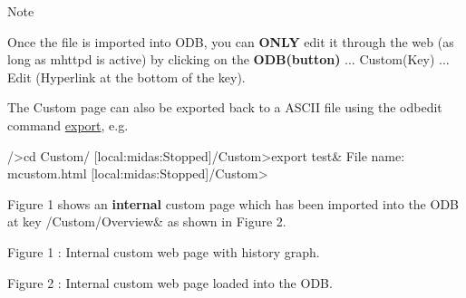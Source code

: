 \begin{DoxyNote}{Note}

\begin{DoxyItemize}
\item Once the file is imported into ODB, you can {\bfseries ONLY} edit it through the web (as long as mhttpd is active) by clicking on the {\bfseries ODB(button)} ... Custom(Key) ... Edit (Hyperlink at the bottom of the key).
\end{DoxyItemize}
\end{DoxyNote}

\begin{DoxyItemize}
\item The Custom page can also be exported back to a ASCII file using the odbedit command \hyperlink{RC_odbedit_examples_RC_odbedit_export}{export}, e.g. 
\begin{DoxyCode}
  />cd Custom/
  [local:midas:Stopped]/Custom>export test&
  File name: mcustom.html
  [local:midas:Stopped]/Custom>
\end{DoxyCode}

\end{DoxyItemize}

Figure 1 shows an {\bfseries internal} custom page which has been imported into the ODB at key /Custom/Overview\& as shown in Figure 2.

\par
\par
\par
 \begin{center}  Figure 1 : Internal custom web page with history graph. \par
\par
\par
  \end{center}  \par
\par
\par


\par
\par
\par
 \begin{center}  Figure 2 : Internal custom web page loaded into the ODB. \par
\par
\par
  \end{center}  \par
\par
\par


\par


\par
 \par




\label{index_end}
\hypertarget{index_end}{}
 